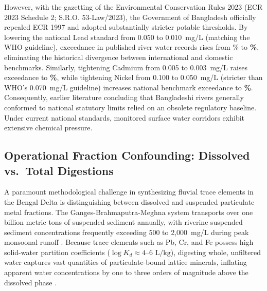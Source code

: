 \documentclass[authoryear,preprint,12pt]{elsarticle}
\begin{document}
However, with the gazetting of the Environmental Conservation Rules 2023 (ECR 2023 Schedule 2; S.R.O. 53-Law/2023), the Government of Bangladesh officially repealed ECR 1997 and adopted substantially stricter potable thresholds. By lowering the national Lead standard from 0.050 to 0.010~mg/L (matching the WHO guideline), exceedance in published river water records rises from \LeadBdNineteenNinetySevenExceedPct\% to \textbf{\LeadBdTwentyTwentyThreeExceedPct\%}, eliminating the historical divergence between international and domestic benchmarks. Similarly, tightening Cadmium from 0.005 to 0.003~mg/L raises exceedance to \textbf{\CadmiumBdTwentyTwentyThreeExceedPct\%}, while tightening Nickel from 0.100 to 0.050~mg/L (stricter than WHO's 0.070~mg/L guideline) increases national benchmark exceedance to \textbf{\NickelBdTwentyTwentyThreeExceedPct\%}. Consequently, earlier literature concluding that Bangladeshi rivers generally conformed to national statutory limits relied on an obsolete regulatory baseline. Under current national standards, monitored surface water corridors exhibit extensive chemical pressure.

\subsection{Operational Fraction Confounding: Dissolved vs.\ Total Digestions}
A paramount methodological challenge in synthesizing fluvial trace elements in the Bengal Delta is distinguishing between dissolved and suspended particulate metal fractions. The Ganges-Brahmaputra-Meghna system transports over one billion metric tons of suspended sediment annually, with riverine suspended sediment concentrations frequently exceeding 500 to 2,000~mg/L during peak monsoonal runoff \citep{Goodbred1999}. Because trace elements such as Pb, Cr, and Fe possess high solid-water partition coefficients ($\log K_d \approx 4\text{--}6\text{ L/kg}$), digesting whole, unfiltered water captures vast quantities of particulate-bound lattice minerals, inflating apparent water concentrations by one to three orders of magnitude above the dissolved phase \citep{Gaillardet2014}.
\end{document}
